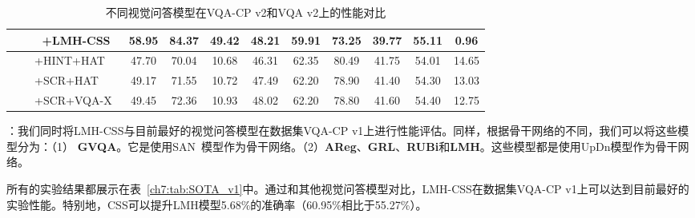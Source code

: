 \begin{table}
\begin{center}
{\begin{tabular}{| l | c c c c | c c c c| c |}
$$                ~~~~+\textbf{LMH-CSS} & \textbf{58.95} & \textbf{84.37} & \textbf{49.42} & \textbf{48.21} & 59.91 & 73.25 & 39.77 & 55.11 & \textbf{0.96}  \\
                \hline\hline
                ~~~~+HINT+HAT~\cite{selvaraju2019taking} & 47.70 & 70.04 & 10.68 & 46.31 & 62.35 & 80.49 & 41.75 & 54.01 & 14.65 \\
                ~~~~+SCR+HAT~\cite{wu2019self} & 49.17 & 71.55 & 10.72 & 47.49 & 62.20 & 78.90 & 41.40 & 54.30 & 13.03  \\
                ~~~~+SCR+VQA-X~\cite{wu2019self} & 49.45 & 72.36 & 10.93 & 48.02 & 62.20 & 78.80 & 41.60 & 54.40 & 12.75  \\
                \hline
            \end{tabular}
        } %
    \end{center}
    \caption{不同视觉问答模型在VQA-CP v2和VQA v2上的性能对比} %
    \label{ch7:tab:SOTA_v2}
\end{table}

\textbf{}：我们同时将LMH-CSS与目前最好的视觉问答模型在数据集VQA-CP v1上进行性能评估。同样，根据骨干网络的不同，我们可以将这些模型分为：（1） \textbf{GVQA}。它是使用SAN~\cite{yang2016stacked}模型作为骨干网络。（2）\textbf{AReg}、\textbf{GRL}、\textbf{RUBi}和\textbf{LMH}。这些模型都是使用UpDn模型作为骨干网络。

所有的实验结果都展示在表~\ref{ch7:tab:SOTA_v1}中。通过和其他视觉问答模型对比，LMH-CSS在数据集VQA-CP v1上可以达到目前最好的实验性能。特别地，CSS可以提升LMH模型5.68\%的准确率（60.95\%相比于55.27\%）。

